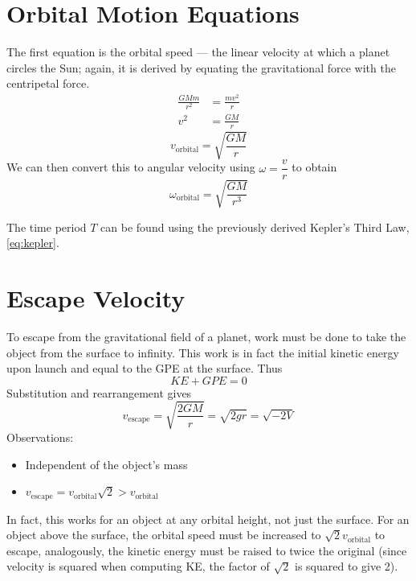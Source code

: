 \documentclass[a4paper,12pt]{article}
\let\oldsection\section
\renewcommand\section{\clearpage\oldsection}
\begin{document}
\section{Orbital Motion Equations}

The first equation is the orbital speed --- the linear velocity at which a planet circles the Sun; again, it is derived by equating the gravitational force with the centripetal force.
\begin{align*}
  \frac{GMm}{r^2} & = \frac{mv^2}{r} \\
  v^2             & = \frac{GM}{r}
\end{align*}
\begin{equation}\label{eq:orbital_speed}
  v_{\text{orbital}}               = \sqrt{\frac{GM}{r}}
\end{equation}
We can then convert this to angular velocity using $\omega = \dfrac{v}{r}$ to obtain
\begin{equation}\label{eq:angular_velocity}
  \omega_{\text{orbital}} = \sqrt{\frac{GM}{r^3}}
\end{equation}

The time period $T$ can be found using the previously derived Kepler's Third Law, \cref{eq:kepler}.

\section{Escape Velocity}

To escape from the gravitational field of a planet, work must be done to take the object from the surface to infinity. This work is in fact the initial kinetic energy upon launch and equal to the GPE at the surface. Thus $$KE + GPE = 0$$
Substitution and rearrangement gives \begin{equation}\label{eq:escape_velocity}
  v_{\text{escape}} = \sqrt{\frac{2GM}{r}} = \sqrt{2gr} = \sqrt{-2V}
\end{equation}
Observations:
\begin{itemize}
  \item Independent of the object's mass
  \item $v_{\text{escape}} = v_\text{orbital}\sqrt{2} > v_{\text{orbital}}$
\end{itemize}
In fact, this works for an object at any orbital height, not just the surface. For an object above the surface, the orbital speed must be increased to $\sqrt{2}v_{\text{orbital}}$ to escape, analogously, the kinetic energy must be raised to twice the original (since velocity is squared when computing KE, the factor of $\sqrt{2}$ is squared to give 2).
\end{document}
